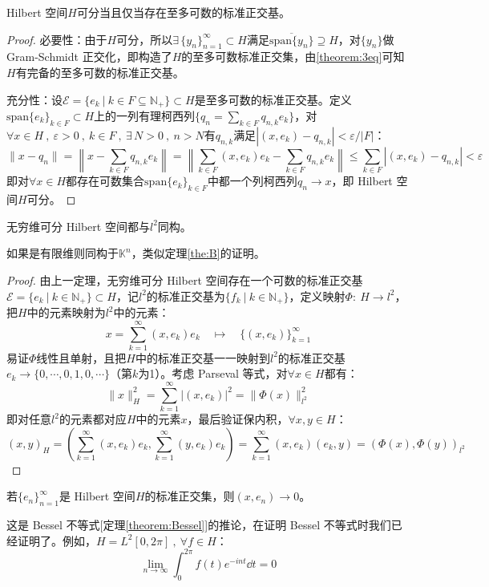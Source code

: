 \begin{theorem}
Hilbert 空间$H$可分当且仅当存在至多可数的标准正交基。
\end{theorem}
\begin{proof}
必要性：由于$H$可分，所以$\exists \, \{y_n\}_{n=1}^{\infty} \subset H$满足$\overline{\text{span}\{y_n\}} \supseteq H$，对$\{y_n\}$做 Gram-Schmidt 正交化，即构造了$H$的至多可数标准正交集，由\ref{theorem:3eq}可知$H$有完备的至多可数的标准正交基。

充分性：设$\mathscr{E}=\{e_k \ | \ k \in F \subseteq \mathbb{N}_+\} \subset H$是至多可数的标准正交基。定义$\text{span}\{e_k\}_{k \in F} \subset H$上的一列有理柯西列$\{q_n=\sum_{k \in F}q_{n,k}e_k\}$，对$\forall x \in H \ , \ \varepsilon>0 \ , \ k \in F \ , \ \exists \, N>0 \ , \ n>N$有$q_{n,k}$满足$|(x,e_k)-q_{n,k}|<\varepsilon/|F|$：
\[\|x-q_n\|=\left\|x-\sum_{k \in F}q_{n,k}e_k\right\|=\left\|\sum_{k \in F}(x,e_k)e_k-\sum_{k \in F}q_{n,k}e_k\right\| \leq \sum_{k \in F}|(x,e_k)-q_{n,k}|<\varepsilon\]
即对$\forall x \in H$都存在可数集合$\text{span}\{e_k\}_{k \in F}$中都一个列柯西列$q_n \to x$，即 Hilbert 空间$H$可分。
\end{proof}

\begin{theorem}
无穷维可分 Hilbert 空间都与$l^2$同构。
\end{theorem}
\begin{remark}
\quad 如果是有限维则同构于$\mathbb{K}^n$，类似定理\ref{the:B}的证明。
\end{remark}
\begin{proof}
由上一定理，无穷维可分 Hilbert 空间存在一个可数的标准正交基$\mathscr{E}=\{e_k \ | \ k \in \mathbb{N}_+\} \subset H$，记$l^2$的标准正交基为$\{f_k \ | \ k \in \mathbb{N}_+\}$，定义映射$\Phi: \ H \to l^2$，把$H$中的元素映射为$l^2$中的元素：
\[x=\sum_{k=1}^{\infty}(x,e_k)e_k \quad \mapsto \quad \{(x,e_k)\}_{k=1}^{\infty}\]
易证$\Phi$线性且单射，且把$H$中的标准正交基一一映射到$l^2$的标准正交基$e_k \to \{0,\cdots,0,1,0,\cdots\}$（第$k$为1）。考虑 Parseval 等式，对$\forall x \in H$都有：
\[\|x\|^2_H=\sum_{k=1}^{\infty}|(x,e_k)|^2=\|\Phi(x)\|^2_{l^2}\]
即对任意$l^2$的元素都对应$H$中的元素$x$，最后验证保内积，$\forall x,y \in H$：
\[(x,y)_H=\left(\sum_{k=1}^{\infty}(x,e_k)e_k,\sum_{k=1}^{\infty}(y,e_k)e_k\right)=\sum_{k=1}^{\infty}(x,e_k)(e_k,y)=(\Phi(x),\Phi(y))_{l^2}\]
\end{proof}

\begin{proposition}
若$\{e_n\}_{n=1}^{\infty}$是 Hilbert 空间$H$的标准正交集，则$(x,e_n) \to 0$。
\end{proposition}
\begin{remark}
\quad 这是 Bessel 不等式[定理\ref{theorem:Bessel}]的推论，在证明 Bessel 不等式时我们已经证明了。例如，$H=L^2[0,2\pi] \ , \ \forall f \in H$：
\[\lim_{n \to \infty}\int_0^{2\pi}f(t)e^{-int}\dd{t}=0\]
\end{remark}


